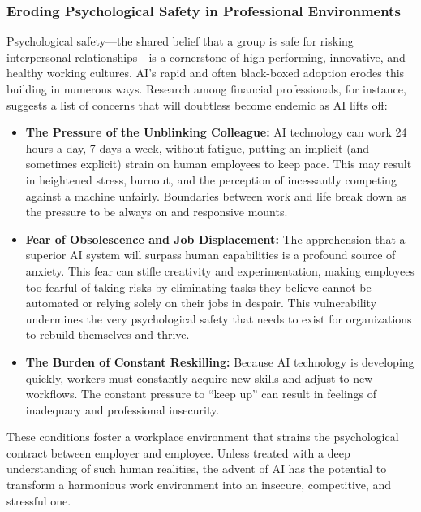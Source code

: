\documentclass{article}
\begin{document}
\subsubsection{Eroding Psychological Safety in Professional Environments}
Psychological safety—the shared belief that a group is safe for risking interpersonal relationships—is a cornerstone of high-performing, innovative, and healthy working cultures. AI's rapid and often black-boxed adoption erodes this building in numerous ways. Research among financial professionals, for instance, suggests a list of concerns that will doubtless become endemic as AI lifts off:
\begin{itemize}
    \item \textbf{The Pressure of the Unblinking Colleague:} AI technology can work 24 hours a day, 7 days a week, without fatigue, putting an implicit (and sometimes explicit) strain on human employees to keep pace. This may result in heightened stress, burnout, and the perception of incessantly competing against a machine unfairly. Boundaries between work and life break down as the pressure to be always on and responsive mounts.
    \item \textbf{Fear of Obsolescence and Job Displacement:} The apprehension that a superior AI system will surpass human capabilities is a profound source of anxiety. This fear can stifle creativity and experimentation, making employees too fearful of taking risks by eliminating tasks they believe cannot be automated or relying solely on their jobs in despair. This vulnerability undermines the very psychological safety that needs to exist for organizations to rebuild themselves and thrive.
    \item \textbf{The Burden of Constant Reskilling:} Because AI technology is developing quickly, workers must constantly acquire new skills and adjust to new workflows. The constant pressure to “keep up” can result in feelings of inadequacy and professional insecurity.
\end{itemize}
These conditions foster a workplace environment that strains the psychological contract between employer and employee. Unless treated with a deep understanding of such human realities, the advent of AI has the potential to transform a harmonious work environment into an insecure, competitive, and stressful one.
\end{document}
